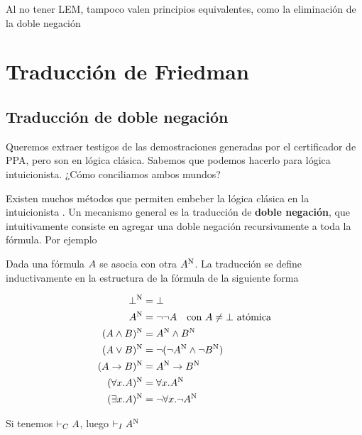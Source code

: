 Al no tener LEM, tampoco valen principios equivalentes, como la eliminación de
la doble negación 

\section{Traducción de Friedman}

\subsection{Traducción de doble negación}

Queremos extraer testigos de las demostraciones generadas por el certificador de
PPA, pero son en lógica clásica. Sabemos que podemos hacerlo para lógica
intuicionista. ¿Cómo conciliamos ambos mundos?

Existen muchos métodos que permiten embeber la lógica clásica en la
intuicionista . Un mecanismo general es la traducción de
\textbf{doble negación}, que intuitivamente consiste en agregar una doble
negación recursivamente a toda la fórmula. Por ejemplo

\newcommand{\gN}[1]{#1^{\text{N}}}

\begin{definition} Dada una fórmula $A$ se asocia con otra $\gN{\form}$. La
    traducción se define inductivamente en la estructura de la fórmula de la
    siguiente forma

    \begin{align*}
        \gN{\bot} &= \bot\\
        \gN{\form} &= \neg\neg \form \quad \text{con $\form \neq \bot$ atómica}\\
        \gN{(\form \wedge \formTwo)} &= \gN{\form} \wedge \gN{\formTwo}\\
        \gN{(\form \vee \formTwo)} &= \neg(\neg\gN{\form} \wedge \neg\gN{\formTwo})\\
        \gN{(\form \rightarrow \formTwo)} &= \gN{\form} \rightarrow \gN{\formTwo}\\
        \gN{(\forall \var . \form)} &= \forall \var . \gN{\form}\\
        \gN{(\exists \var . \form)} &= \neg \forall \var . \neg \gN{\form}
    \end{align*}
\end{definition}

\begin{theorem}
    Si tenemos $\vdash_C A$, luego $\judgI \gN{\form}$
\end{theorem}

